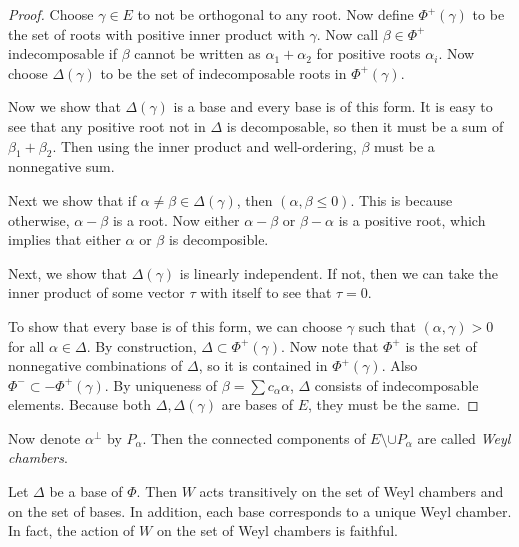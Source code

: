 \documentclass[twoside, 10pt]{article}
\begin{document}
    \begin{proof} Choose $\gamma \in E$ to not be orthogonal to any root. Now
        define $\Phi^+(\gamma)$ to be the set of roots with positive inner
        product with $\gamma$. Now call $\beta \in \Phi^+$ indecomposable if
        $\beta$ cannot be written as $\alpha_1 + \alpha_2$ for positive roots
        $\alpha_i$. Now choose $\Delta(\gamma)$ to be the set of indecomposable
        roots in $\Phi^+(\gamma)$.

        Now we show that $\Delta(\gamma)$ is a base and every base is of this
        form. It is easy to see that any positive root not in $\Delta$ is
        decomposable, so then it must be a sum of $\beta_1 + \beta_2$. Then
        using the inner product and well-ordering, $\beta$ must be a
        nonnegative sum.

        Next we show that if $\alpha \neq \beta \in \Delta(\gamma)$, then
        $(\alpha,\beta \leq 0)$. This is because otherwise, $\alpha - \beta$ is
        a root. Now either $\alpha-\beta$ or $\beta-\alpha$ is a positive root,
        which implies that either $\alpha$ or $\beta$ is decomposible.

        Next, we show that $\Delta(\gamma)$ is linearly independent. If not,
        then we can take the inner product of some vector $\tau$ with itself to
        see that $\tau = 0$.

        To show that every base is of this form, we can choose $\gamma$ such
    that $(\alpha,\gamma) > 0$ for all $\alpha \in \Delta$. By construction,
$\Delta \subset \Phi^+(\gamma)$. Now note that $\Phi^+$ is the set of
nonnegative combinations of $\Delta$, so it is contained in $\Phi^+(\gamma)$.
Also $\Phi^- \subset -\Phi^+(\gamma)$. By uniqueness of $\beta = \sum
c_{\alpha}\alpha$, $\Delta$ consists of indecomposable elements. Because both
$\Delta, \Delta(\gamma)$ are bases of $E$, they must be the same.  \end{proof}

    Now denote $\alpha^{\perp}$ by $P_{\alpha}$. Then the connected components
    of $E \setminus \cup P_{\alpha}$ are called \textit{Weyl chambers}.

    \begin{thm} Let $\Delta$ be a base of $\Phi$. Then $W$ acts transitively on
        the set of Weyl chambers and on the set of bases. In addition, each
        base corresponds to a unique Weyl chamber. In fact, the action of $W$
        on the set of Weyl chambers is faithful.  \end{thm}
\end{document}
